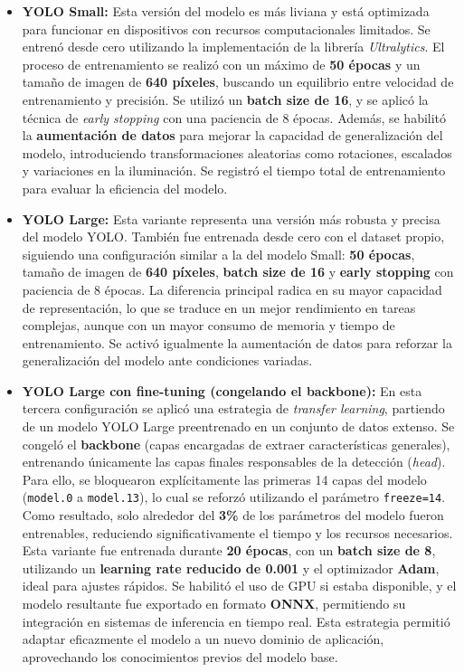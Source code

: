 \begin{itemize}
    \item \textbf{YOLO Small:} 
    Esta versión del modelo es más liviana y está optimizada para funcionar en dispositivos con recursos computacionales limitados. Se entrenó desde cero utilizando la implementación de la librería \textit{Ultralytics}. El proceso de entrenamiento se realizó con un máximo de \textbf{50 épocas} y un tamaño de imagen de \textbf{640 píxeles}, buscando un equilibrio entre velocidad de entrenamiento y precisión. Se utilizó un \textbf{batch size de 16}, y se aplicó la técnica de \textit{early stopping} con una paciencia de 8 épocas. Además, se habilitó la \textbf{aumentación de datos} para mejorar la capacidad de generalización del modelo, introduciendo transformaciones aleatorias como rotaciones, escalados y variaciones en la iluminación. Se registró el tiempo total de entrenamiento para evaluar la eficiencia del modelo.

    \item \textbf{YOLO Large:}
    Esta variante representa una versión más robusta y precisa del modelo YOLO. También fue entrenada desde cero con el dataset propio, siguiendo una configuración similar a la del modelo Small: \textbf{50 épocas}, tamaño de imagen de \textbf{640 píxeles}, \textbf{batch size de 16} y \textbf{early stopping} con paciencia de 8 épocas. La diferencia principal radica en su mayor capacidad de representación, lo que se traduce en un mejor rendimiento en tareas complejas, aunque con un mayor consumo de memoria y tiempo de entrenamiento. Se activó igualmente la aumentación de datos para reforzar la generalización del modelo ante condiciones variadas.

    \item \textbf{YOLO Large con fine-tuning (congelando el backbone):}
    En esta tercera configuración se aplicó una estrategia de \textit{transfer learning}, partiendo de un modelo YOLO Large preentrenado en un conjunto de datos extenso. Se congeló el \textbf{backbone} (capas encargadas de extraer características generales), entrenando únicamente las capas finales responsables de la detección (\textit{head}). Para ello, se bloquearon explícitamente las primeras 14 capas del modelo (\texttt{model.0} a \texttt{model.13}), lo cual se reforzó utilizando el parámetro \texttt{freeze=14}. Como resultado, solo alrededor del \textbf{3\%} de los parámetros del modelo fueron entrenables, reduciendo significativamente el tiempo y los recursos necesarios. Esta variante fue entrenada durante \textbf{20 épocas}, con un \textbf{batch size de 8}, utilizando un \textbf{learning rate reducido de 0.001} y el optimizador \textbf{Adam}, ideal para ajustes rápidos. Se habilitó el uso de GPU si estaba disponible, y el modelo resultante fue exportado en formato \textbf{ONNX}, permitiendo su integración en sistemas de inferencia en tiempo real.
    Esta estrategia permitió adaptar eficazmente el modelo a un nuevo dominio de aplicación, aprovechando los conocimientos previos del modelo base.
\end{itemize}

